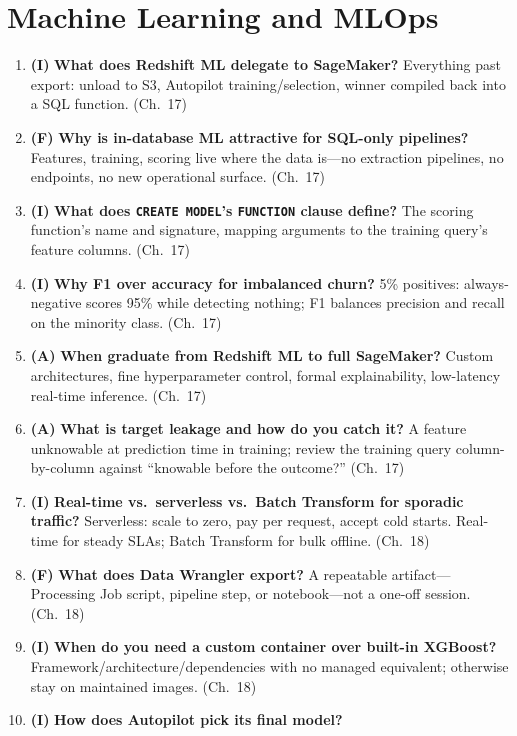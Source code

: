 \section{Machine Learning and MLOps}
\begin{enumerate}
    \item \textbf{(I)} \textbf{What does Redshift ML delegate to SageMaker?}
    Everything past export: unload to S3, Autopilot training/selection, winner compiled back into a
    SQL function. (Ch.~17)
    \item \textbf{(F)} \textbf{Why is in-database ML attractive for SQL-only pipelines?}
    Features, training, scoring live where the data is---no extraction pipelines, no endpoints, no
    new operational surface. (Ch.~17)
    \item \textbf{(I)} \textbf{What does \texttt{CREATE MODEL}'s \texttt{FUNCTION} clause define?}
    The scoring function's name and signature, mapping arguments to the training query's feature
    columns. (Ch.~17)
    \item \textbf{(I)} \textbf{Why F1 over accuracy for imbalanced churn?}
    5\% positives: always-negative scores 95\% while detecting nothing; F1 balances precision and
    recall on the minority class. (Ch.~17)
    \item \textbf{(A)} \textbf{When graduate from Redshift ML to full SageMaker?}
    Custom architectures, fine hyperparameter control, formal explainability, low-latency
    real-time inference. (Ch.~17)
    \item \textbf{(A)} \textbf{What is target leakage and how do you catch it?}
    A feature unknowable at prediction time in training; review the training query column-by-column
    against ``knowable before the outcome?'' (Ch.~17)
    \item \textbf{(I)} \textbf{Real-time vs.\ serverless vs.\ Batch Transform for sporadic traffic?}
    Serverless: scale to zero, pay per request, accept cold starts. Real-time for steady SLAs;
    Batch Transform for bulk offline. (Ch.~18)
    \item \textbf{(F)} \textbf{What does Data Wrangler export?}
    A repeatable artifact---Processing Job script, pipeline step, or notebook---not a one-off
    session. (Ch.~18)
    \item \textbf{(I)} \textbf{When do you need a custom container over built-in XGBoost?}
    Framework/architecture/dependencies with no managed equivalent; otherwise stay on maintained
    images. (Ch.~18)
    \item \textbf{(I)} \textbf{How does Autopilot pick its final model?}

\end{enumerate}

